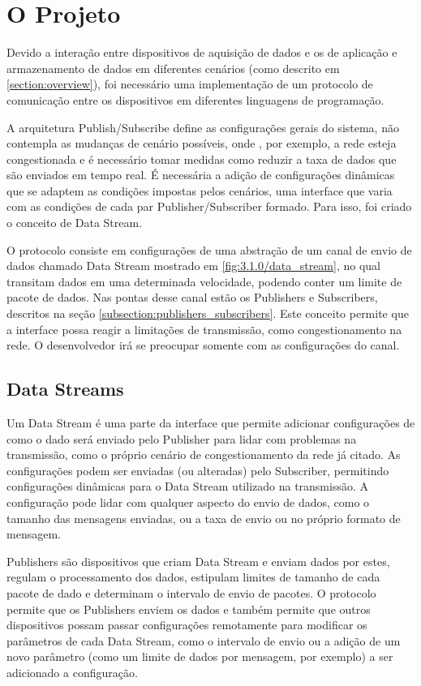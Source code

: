 \chapter{O Projeto}
\label{chapter:projeto}

Devido a interação entre dispositivos de aquisição de dados e os de aplicação e armazenamento de dados em diferentes cenários (como descrito em \ref{section:overview}), foi necessário uma implementação de um protocolo de comunicação entre os dispositivos em diferentes linguagens de programação.

A arquitetura Publish/Subscribe define as configurações gerais do sistema, não contempla as mudanças de cenário possíveis, onde , por exemplo, a rede esteja congestionada e é necessário tomar medidas como reduzir a taxa de dados que são enviados em tempo real. É necessária a adição de configurações dinâmicas que se adaptem as condições impostas pelos cenários, uma interface que varia com as condições de cada par Publisher/Subscriber formado. Para isso, foi criado o conceito de Data Stream.

O protocolo consiste em configurações de uma abstração de um canal de envio de dados chamado Data Stream mostrado em \ref{fig:3.1.0/data_stream}, no qual transitam dados em uma determinada velocidade, podendo conter um limite de pacote de dados. Nas pontas desse canal estão os Publishers e Subscribers, descritos na seção \ref{subsection:publishers_subscribers}. Este conceito permite  que a interface possa reagir a limitações de transmissão, como congestionamento na rede. O desenvolvedor irá se preocupar somente com as configurações do canal.


\section{Data Streams}
\label{section:data_stream}

Um Data Stream é uma parte da interface que permite adicionar configurações de como o dado será enviado pelo Publisher  para lidar com problemas na transmissão, como o próprio cenário de congestionamento da rede já citado. As configurações podem ser enviadas (ou alteradas) pelo Subscriber, permitindo configurações dinâmicas para o Data Stream utilizado na transmissão. A configuração pode lidar com qualquer aspecto do envio de dados, como o tamanho das mensagens enviadas, ou a taxa de envio ou no próprio formato de mensagem.


Publishers são dispositivos que criam Data Stream  e enviam dados por estes, regulam o processamento dos dados, estipulam limites de tamanho de cada pacote de dado e determinam o intervalo de envio de pacotes. O protocolo permite que os Publishers enviem os dados e também permite que outros dispositivos possam passar configurações remotamente para modificar os parâmetros de cada Data Stream, como o intervalo de envio ou a adição de um novo parâmetro (como um limite de dados por mensagem, por exemplo) a ser adicionado a configuração. 

